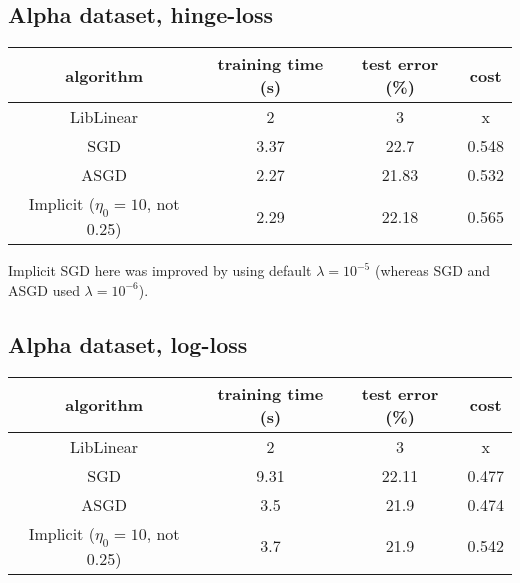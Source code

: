 \documentclass{article}
\begin{document}
\subsection{Alpha dataset, hinge-loss}
\begin{center}
\begin{tabular}{ c | c | c | c }
  algorithm & training time (s) & test error (\%) & cost \\ \hline                       
  LibLinear & 2 & 3 & x\\
  SGD & 3.37 & 22.7 & 0.548\\
  ASGD & 2.27 & 21.83 & 0.532\\
  Implicit ($\eta_0=10$, not 0.25) & 2.29 & 22.18 & 0.565\\
\end{tabular}
\end{center}
Implicit SGD here was improved by using default $\lambda = 10^{-5}$ (whereas SGD and ASGD used $\lambda = 10^{-6}$).

\subsection{Alpha dataset, log-loss}
\begin{center}
\begin{tabular}{ c | c | c | c }
  algorithm & training time (s) & test error (\%) & cost \\ \hline                       
  LibLinear & 2 & 3 & x\\
  SGD & 9.31 &  22.11 & 0.477\\
  ASGD & 3.5 & 21.9 & 0.474\\
  Implicit ($\eta_0=10$, not 0.25) & 3.7 & 21.9 & 0.542\\
\end{tabular}
\end{center}
\end{document}
